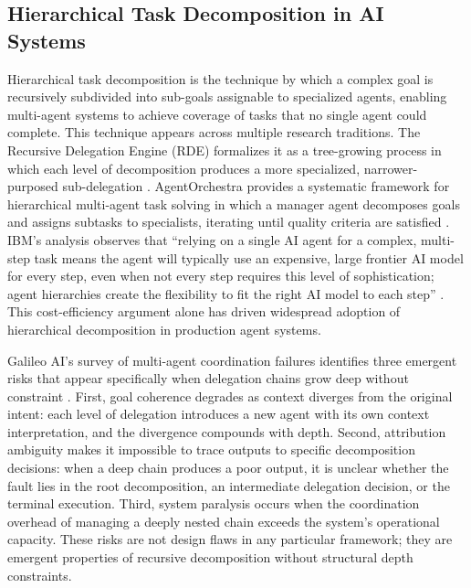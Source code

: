\subsection{Hierarchical Task Decomposition in AI Systems}\label{sec:task-decomposition}

Hierarchical task decomposition is the technique by which a complex goal is recursively subdivided into sub-goals assignable to specialized agents, enabling multi-agent systems to achieve coverage of tasks that no single agent could complete.  This technique appears across multiple research traditions.  The Recursive Delegation Engine (RDE) formalizes it as a tree-growing process in which each level of decomposition produces a more specialized, narrower-purposed sub-delegation \cite{rde2025}.  AgentOrchestra provides a systematic framework for hierarchical multi-agent task solving in which a manager agent decomposes goals and assigns subtasks to specialists, iterating until quality criteria are satisfied \cite{agentorchestra2025}.  IBM's analysis observes that ``relying on a single AI agent for a complex, multi-step task means the agent will typically use an expensive, large frontier AI model for every step, even when not every step requires this level of sophistication; agent hierarchies create the flexibility to fit the right AI model to each step'' \cite{ibm2025hierarchical}.  This cost-efficiency argument alone has driven widespread adoption of hierarchical decomposition in production agent systems.

Galileo AI's survey of multi-agent coordination failures identifies three emergent risks that appear specifically when delegation chains grow deep without constraint \cite{multi_agent_coordination_strategies}.  First, goal coherence degrades as context diverges from the original intent: each level of delegation introduces a new agent with its own context interpretation, and the divergence compounds with depth.  Second, attribution ambiguity makes it impossible to trace outputs to specific decomposition decisions: when a deep chain produces a poor output, it is unclear whether the fault lies in the root decomposition, an intermediate delegation decision, or the terminal execution.  Third, system paralysis occurs when the coordination overhead of managing a deeply nested chain exceeds the system's operational capacity.  These risks are not design flaws in any particular framework; they are emergent properties of recursive decomposition without structural depth constraints.

